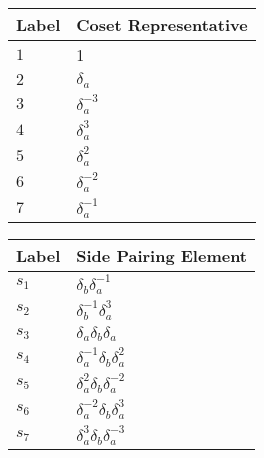 \documentclass{article}
\begin{document}

\begin{center}
\begin{tabular}{ll}
\toprule
Label & Coset Representative\\
\midrule
$1$ & 1 \\
$2$ & $\delta_a^{}$ \\
$3$ & $\delta_a^{-3}$ \\
$4$ & $\delta_a^{3}$ \\
$5$ & $\delta_a^{2}$ \\
$6$ & $\delta_a^{-2}$ \\
$7$ & $\delta_a^{-1}$ \\
\bottomrule
\end{tabular}
\hfill
\begin{tabular}{ll}
\toprule
Label & Side Pairing Element\\
\midrule
$s_{1}$ & $\delta_b^{}\delta_a^{-1}$ \\
$s_{2}$ & $\delta_b^{-1}\delta_a^{3}$ \\
$s_{3}$ & $\delta_a^{}\delta_b^{}\delta_a^{}$ \\
$s_{4}$ & $\delta_a^{-1}\delta_b^{}\delta_a^{2}$ \\
$s_{5}$ & $\delta_a^{2}\delta_b^{}\delta_a^{-2}$ \\
$s_{6}$ & $\delta_a^{-2}\delta_b^{}\delta_a^{3}$ \\
$s_{7}$ & $\delta_a^{3}\delta_b^{}\delta_a^{-3}$ \\
\bottomrule
\end{tabular}
\end{center}

\thispagestyle{empty}
\end{document}
